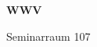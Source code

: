 \documentclass[a4paper]{article}
\begin{document}
\printGenericVSLHeader
\begin{center}
\begin{vsltext}{3cm}{4cm}

   \vspace{0.5cm} 

    \textbf{WWV} 

    \vspace{1.5cm}

    Seminarraum 107

\end{vsltext}

\end{center}
\end{document}
